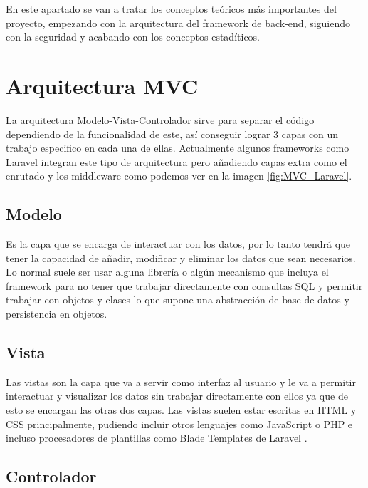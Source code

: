 
En este apartado se van a tratar los conceptos teóricos más importantes del proyecto, empezando con la arquitectura del framework de back-end, siguiendo con la seguridad y acabando con los conceptos estadíticos. 

\section{Arquitectura MVC}\label{MVC}

La arquitectura Modelo-Vista-Controlador sirve para separar el código dependiendo de la funcionalidad de este, así conseguir lograr 3 capas con un trabajo especifico en cada una de ellas\cite{MVC}. Actualmente algunos frameworks como Laravel integran este tipo de arquitectura pero añadiendo capas extra como el enrutado y los middleware como podemos ver en la imagen \ref{fig:MVC_Laravel}.


\subsection{Modelo}

Es la capa que se encarga de interactuar con los datos, por lo tanto tendrá que tener la capacidad de añadir, modificar y eliminar los datos que sean necesarios. Lo normal suele ser usar alguna librería o algún mecanismo que incluya el framework para no tener que trabajar directamente con consultas SQL y permitir trabajar con objetos y clases lo que supone una abstracción de base de datos y persistencia en objetos\cite{MVC}.

\subsection{Vista}

Las vistas son la capa que va a servir como interfaz al usuario y le va a permitir interactuar y visualizar los datos sin trabajar directamente con ellos ya que de esto se encargan las otras dos capas. Las vistas suelen estar escritas en HTML y CSS principalmente, pudiendo incluir otros lenguajes como JavaScript o PHP e incluso procesadores de plantillas como Blade Templates de Laravel \cite{MVC}.

\subsection{Controlador}

